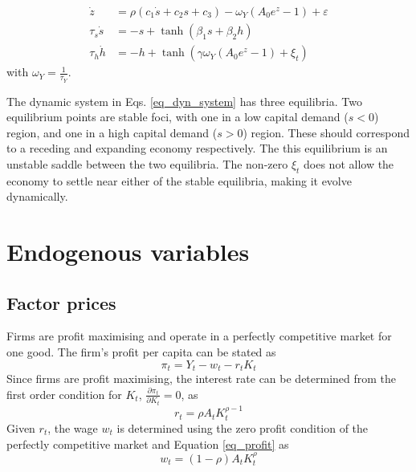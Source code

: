 \documentclass[11pt]{article}
\begin{document}
\begin{subequations}\label{eq_dyn_system}
\begin{align}
\dot{z}&=\rho(c_1 \dot{s} + c_2 s + c_3) - \omega_Y(A_0e^{z}-1) + \varepsilon \label{eq_dyn_kd}\\
\tau_s \dot{s}&=-s + \tanh( \beta_1 s + \beta_2 h) \label{eq_sentiment}\\
\tau_h \dot{h}&=-h + \tanh(\gamma\omega_Y(A_0e^{z}-1) + \xi_t)\label{eq_info}
\end{align}
\end{subequations}
with $\omega_Y = \frac{1}{\tau_Y}$.

The dynamic system in Eqs. \eqref{eq_dyn_system} has three equilibria. Two equilibrium points are stable foci, with one in a low capital demand ($s<0$) region, and one in a high capital demand ($s>0$) region. These should correspond to a receding and expanding economy respectively. The this equilibrium is an unstable saddle between the two equilibria. The non-zero $\xi_t$ does not allow the economy to settle near either of the stable equilibria, making it evolve dynamically.

\section{Endogenous variables}

\subsection{Factor prices}\label{sec_eq_wage}
Firms are profit maximising and operate in a perfectly competitive market for one good. The firm's profit per capita can be stated as 
\begin{equation}\label{eq_profit}
\pi_t = Y_t - w_t - r_tK_t
\end{equation}
Since firms are profit maximising, the interest rate can be determined from the first order condition for $K_t$, $\frac{\partial\pi_t}{\partial K_t} = 0$, as
\begin{equation}\label{eq_interest}
r_t = \rho A_t K_t^{\rho-1} 
\end{equation}
Given $r_t$, the wage $w_t$ is determined using the zero profit condition of the perfectly competitive market and Equation \eqref{eq_profit} as 
\begin{equation}\label{eq_wage}
w_t =(1-\rho)A_tK_t^{\rho} 
\end{equation}

\end{document}
